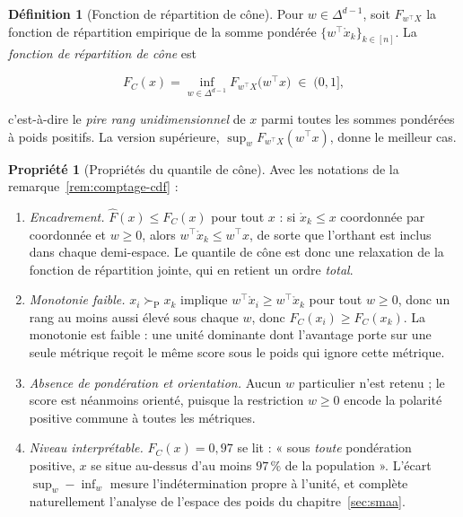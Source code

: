 \documentclass[11pt,a4paper]{article}
\theoremstyle{definition}
\newtheorem{definition}{Définition}[section]
\newtheorem{propriete}{Propriété}[section]
\theoremstyle{remark}
\newcommand{\simplex}{\Delta^{d-1}}
\newcommand{\pareto}{\succ_{\mathrm{P}}}
\begin{document}
\medskip

\begin{definition}[Fonction de répartition de cône]
  \label{def:cone}
  Pour $w \in \simplex$, soit $F_{w^\top X}$ la fonction de répartition empirique de la
  somme pondérée $\{w^\top \mathring{x}_k\}_{k \in [n]}$. La \emph{fonction de
  répartition de cône} est

  \medskip

  \[
    F_C(x) = \inf_{w \in \simplex} F_{w^\top X}\big(w^\top x\big)
    \;\in\; (0,1],
  \]

  \bigskip

  c'est-à-dire le \emph{pire rang unidimensionnel} de $x$ parmi toutes les sommes
  pondérées à poids positifs. La version supérieure, $\sup_{w} F_{w^\top X}(w^\top x)$,
  donne le meilleur cas.
\end{definition}

\bigskip

\begin{propriete}[Propriétés du quantile de cône]
  \label{prop:cone}
  Avec les notations de la remarque~\ref{rem:comptage-cdf} :

  \medskip

  \begin{enumerate}[nosep,leftmargin=1.8em]
    \item \emph{Encadrement.} $\hat{F}(x) \le F_C(x)$ pour tout $x$ : si
    $\mathring{x}_k \le x$ coordonnée par coordonnée et $w \ge 0$, alors
    $w^\top \mathring{x}_k \le w^\top x$, de sorte que l'orthant est inclus dans chaque
    demi-espace. Le quantile de cône est donc une relaxation de la fonction de
    répartition jointe, qui en retient un ordre \emph{total}.
    \item \emph{Monotonie faible.} $x_i \pareto x_k$ implique
    $w^\top \mathring{x}_i \ge w^\top \mathring{x}_k$ pour tout $w \ge 0$, donc un rang au
    moins aussi élevé sous chaque $w$, donc $F_C(x_i) \ge F_C(x_k)$. La monotonie est
    faible : une unité dominante dont l'avantage porte sur une seule métrique reçoit le
    même score sous le poids qui ignore cette métrique.
    \item \emph{Absence de pondération et orientation.} Aucun $w$ particulier n'est
    retenu ; le score est néanmoins orienté, puisque la restriction $w \ge 0$ encode
    la polarité positive commune à toutes les métriques.
    \item \emph{Niveau interprétable.} $F_C(x) = 0{,}97$ se lit : « sous \emph{toute}
    pondération positive, $x$ se situe au-dessus d'au moins $97\,\%$ de la population ».
    L'écart $\sup_w - \inf_w$ mesure l'indétermination propre à l'unité, et complète
    naturellement l'analyse de l'espace des poids du chapitre~\ref{sec:smaa}.
  \end{enumerate}
\end{propriete}
\end{document}

